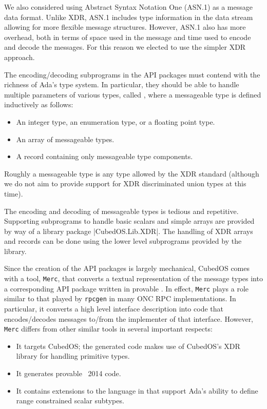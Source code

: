 We also considered using Abstract Syntax Notation One (ASN.1) \cite{asn.1} as a message data
format. Unlike XDR, ASN.1 includes type information in the data stream allowing for more
flexible message structures. However, ASN.1 also has more overhead, both in terms of space used
in the message and time used to encode and decode the messages. For this reason we elected to
use the simpler XDR approach.

The encoding/decoding subprograms in the API packages must contend with the richness of Ada's
type system. In particular, they should be able to handle multiple parameters of various types,
called , where a messageable type is defined inductively as follows:

\begin{itemize}
\item An integer type, an enumeration type, or a floating point type.
\item An array of messageable types.
\item A record containing only messageable type components.
\end{itemize}

Roughly a messageable type is any type allowed by the XDR standard (although we do not aim to
provide support for XDR discriminated union types at this time).

The encoding and decoding of messageable types is tedious and repetitive. Supporting subprograms
to handle basic scalars and simple arrays are provided by way of a library package
|CubedOS.Lib.XDR|. The handling of XDR arrays and records can be done using the lower level
subprograms provided by the library.

Since the creation of the API packages is largely mechanical, CubedOS comes with a tool,
\texttt{Merc}, that converts a textual representation of the message types into a corresponding
API package written in provable \SPARK. In effect, \texttt{Merc} plays a role similar to that
played by \texttt{rpcgen} in many ONC RPC \cite{rfc-5531} implementations. In particular, it
converts a high level interface description into code that encodes/decodes messages to/from the
implementer of that interface. However, \texttt{Merc} differs from other similar tools in several
important respects:

\begin{itemize}
\item It targets CubedOS; the generated code makes use of CubedOS's XDR library for handling
  primitive types.
\item It generates provable \SPARK\ 2014 code.
\item It contains extensions to the language in \cite{rfc-4506} that support Ada's ability to
  define range constrained scalar subtypes.
\end{itemize}

